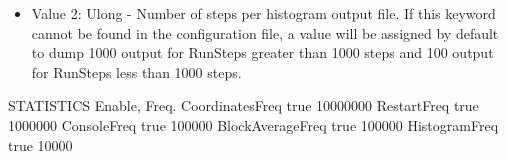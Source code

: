 \documentclass[letterpaper,10pt,english]{sphinxmanual}
\begin{document}
\begin{description}
\begin{itemize}
\item {} 
Value 2: Ulong - Number of steps per histogram output file. If this keyword cannot be found in the configuration file, a value will be assigned by default to dump 1000 output for RunSteps greater than 1000 steps and 100 output for RunSteps less than 1000 steps.

\end{itemize}

%
\begin{sphinxVerbatim}[commandchars=\\\{\}]
\PYGZsh{}\PYGZsh{}\PYGZsh{}\PYGZsh{}\PYGZsh{}\PYGZsh{}\PYGZsh{}\PYGZsh{}\PYGZsh{}\PYGZsh{}\PYGZsh{}\PYGZsh{}\PYGZsh{}\PYGZsh{}\PYGZsh{}\PYGZsh{}\PYGZsh{}\PYGZsh{}\PYGZsh{}\PYGZsh{}\PYGZsh{}\PYGZsh{}\PYGZsh{}\PYGZsh{}\PYGZsh{}\PYGZsh{}\PYGZsh{}\PYGZsh{}\PYGZsh{}\PYGZsh{}\PYGZsh{}\PYGZsh{}\PYGZsh{}
\PYGZsh{} STATISTICS Enable, Freq.
\PYGZsh{}\PYGZsh{}\PYGZsh{}\PYGZsh{}\PYGZsh{}\PYGZsh{}\PYGZsh{}\PYGZsh{}\PYGZsh{}\PYGZsh{}\PYGZsh{}\PYGZsh{}\PYGZsh{}\PYGZsh{}\PYGZsh{}\PYGZsh{}\PYGZsh{}\PYGZsh{}\PYGZsh{}\PYGZsh{}\PYGZsh{}\PYGZsh{}\PYGZsh{}\PYGZsh{}\PYGZsh{}\PYGZsh{}\PYGZsh{}\PYGZsh{}\PYGZsh{}\PYGZsh{}\PYGZsh{}\PYGZsh{}\PYGZsh{}
CoordinatesFreq   true 10000000
RestartFreq       true 1000000
ConsoleFreq       true 100000
BlockAverageFreq  true 100000
HistogramFreq     true 10000
\end{sphinxVerbatim}

\end{description}
\end{document}
